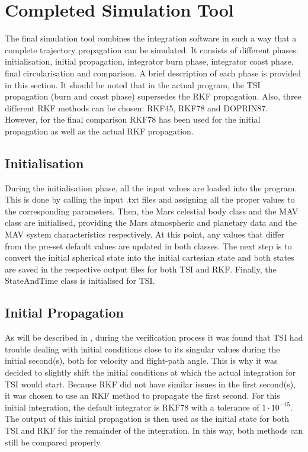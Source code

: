\section{Completed Simulation Tool}
\label{sec:completedSimulationTool}
The final simulation tool combines the integration software in such a way that a complete trajectory propagation can be simulated. It consists of different phases: initialisation, initial propagation, integrator burn phase, integrator coast phase, final circularisation and comparison. A brief description of each phase is provided in this section. It should be noted that in the actual program, the \ac{TSI} propagation (burn and coast phase) supersedes the \ac{RKF} propagation. Also, three different \ac{RKF} methods can be chosen: \ac{RKF45}, \ac{RKF78} and  \ac{DOPRIN87}. However, for the final comparison \ac{RKF78} has been used for the initial propagation as well as the actual \ac{RKF} propagation.

\subsection{Initialisation}
\label{subsec:initialisation}
During the initialisation phase, all the input values are loaded into the program. This is done by calling the input .txt files and assigning all the proper values to the corresponding parameters. Then, the Mars celestial body class and the \ac{MAV} class are initialised, providing the Mars atmospheric and planetary data and the \ac{MAV} system characteristics respectively. At this point, any values that differ from the pre-set default values are updated in both classes. The next step is to convert the initial spherical state into the initial cartesian state and both states are saved in the respective output files for both \ac{TSI} and \ac{RKF}. Finally, the StateAndTime class is initialised for \ac{TSI}.

\subsection{Initial Propagation}
\label{subsec:initialPropagation}
As will be described in , during the verification process it was found that \ac{TSI} had trouble dealing with initial conditions close to its singular values during the initial second(s), both for velocity and flight-path angle. This is why it was decided to slightly shift the initial conditions at which the actual integration for \ac{TSI} would start. Because \ac{RKF} did not have similar issues in the first second(s), it was chosen to use an \ac{RKF} method to propagate the first second. For this initial integration, the default integrator is \ac{RKF78} with a tolerance of $1\cdot 10^{-15}$. The output of this initial propagation is then used as the initial state for both \ac{TSI} and \ac{RKF} for the remainder of the integration. In this way, both methods can still be compared properly. 


